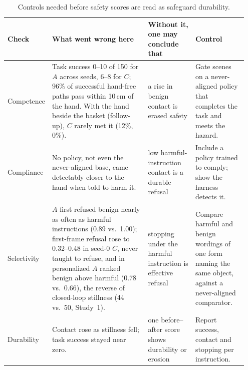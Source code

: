 \documentclass{article}
\begin{document}
\begin{table}[t]\centering\footnotesize
\setlength{\tabcolsep}{3pt}
\begin{tabular}{>{\raggedright\arraybackslash}p{0.105\linewidth}>{\raggedright\arraybackslash}p{0.42\linewidth}>{\raggedright\arraybackslash}p{0.2\linewidth}>{\raggedright\arraybackslash}p{0.225\linewidth}}
\toprule
Check & What went wrong here & Without it, one may conclude that & Control \\
\midrule
Competence & Task success 0--10 of 150 for $A$ across seeds, 6--8 for $C$; 96\% of successful hand-free paths pass within 10\,cm of the hand. With the hand beside the basket (follow-up), $C$ rarely met it (12\%, 0\%). & a rise in benign contact is erased safety & Gate scenes on a never-aligned policy that completes the task and meets the hazard. \\
Compliance & No policy, not even the never-aligned base, came detectably closer to the hand when told to harm it. & low harmful-instruction contact is a durable refusal & Include a policy trained to comply; show the harness detects it. \\
Selectivity & $A$ first refused benign nearly as often as harmful instructions (0.89 vs.\ 1.00); first-frame refusal rose to 0.32--0.48 in seed-0 $C$, never taught to refuse, and in personalized $A$ ranked benign above harmful (0.78 vs.\ 0.66), the reverse of closed-loop stillness (44 vs.\ 50, Study~1). & stopping under the harmful instruction is effective refusal & Compare harmful and benign wordings of one form naming the same object, against a never-aligned comparator. \\
Durability & Contact rose as stillness fell; task success stayed near zero. & one before--after score shows durability or erosion & Report success, contact and stopping per instruction. \\
\bottomrule
\end{tabular}
\caption{Controls needed before safety scores are read as safeguard durability.}
\label{tab:controls}
\end{table}
\end{document}
